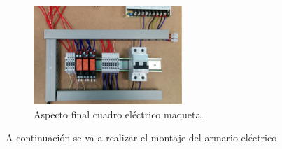     \begin{figure}[H]
            \centering
            \includegraphics[width=0.5\textwidth]{images/maqueta/IMG_20150331_125243.jpg}
            \caption{Aspecto final cuadro eléctrico maqueta.}
            \label{fig:maque_montaje8}
    \end{figure}

A continuación se va a realizar el montaje del armario eléctrico

